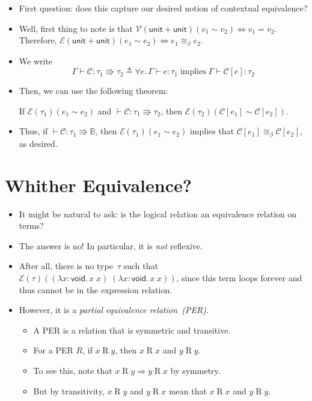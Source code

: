 \documentclass{lecturenotes}
\newcommand{\tabs}[3]{\ensuremath{\lambda #1 \colon #2.\,#3}}
\newcommand{\app}[2]{\ensuremath{#1\;#2}}
\newcommand{\utype}{\textsf{unit}\xspace}
\newcommand{\sumtype}[2]{\ensuremath{#1 + #2}}
\newcommand{\vtype}{\textsf{void}\xspace}
\begin{document}
\begin{itemize}
\item First question: does this capture our desired notion of contextual equivalence?
\item Well, first thing to note is that $\mathcal{V}(\sumtype{\utype}{\utype})(v_1 \sim v_2) \iff v_1 = v_2$.
  Therefore, $\mathcal{E}(\sumtype{\utype}{\utype})(e_1 \sim e_2) \iff e_1 \cong_\beta e_2$.
\item We write $$\Gamma \vdash \mathcal{C} : \tau_1 \Rrightarrow \tau_2 \triangleq \forall e.\, \Gamma \vdash e : \tau_1 \mathrel{\text{implies}} \Gamma \vdash \mathcal{C}[e] : \tau_2$$
\item Then, we can use the following theorem:
\begin{thm}
  If $\mathcal{E}(\tau_1)(e_1 \sim e_2)$ and $\vdash \mathcal{C} : \tau_1 \Rrightarrow \tau_2$, then $\mathcal{E}(\tau_2)(\mathcal{C}[e_1] \sim \mathcal{C}[e_2])$.
\end{thm}
\item Thus, if $\vdash \mathcal{C} : \tau_1 \Rrightarrow \mathbb{B}$, then $\mathcal{E}(\tau_1)(e_1 \sim e_2)$ implies that $\mathcal{C}[e_1] \cong_\beta \mathcal{C}[e_2]$, as desired.
\end{itemize}

\section{Whither Equivalence?}
\label{sec:whither-equivalence}

\begin{itemize}
\item It might be natural to ask: is the logical relation an equivalence relation on terms?
\item The answer is no! In particular, it is \emph{not} reflexive.
\item After all, there is no type~$\tau$ such that $\mathcal{E}(\tau)(\app{(\tabs{x}{\vtype}{\app{x}{x}})}{(\tabs{x}{\vtype}{\app{x}{x}})})$, since this term loops forever and thus cannot be in the expression relation.
\item However, it is a \emph{partial equivalence relation~(PER)}.
  \begin{itemize}
  \item A PER is a relation that is symmetric and transitive.
  \item For a PER $R$, if $x \mathrel{R} y$, then $x \mathrel{R} x$ and $y \mathrel{R} y$.
  \item To see this, note that $x \mathrel{R} y \Rightarrow y \mathrel{R} x$ by symmetry.
  \item But by transitivity, $x \mathrel{R} y$ and $y \mathrel{R} x$ mean that $x \mathrel{R} x$ and $y \mathrel{R} y$.
  \end{itemize}
\end{itemize}
\end{document}
